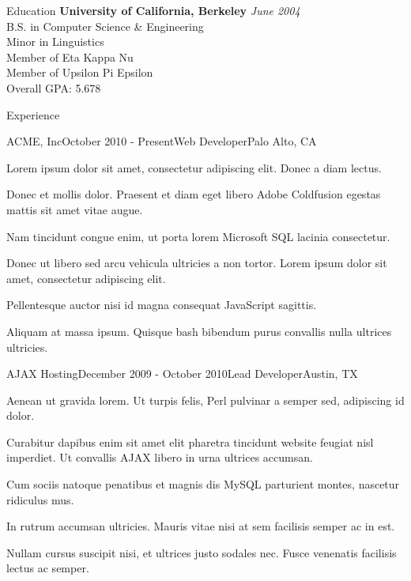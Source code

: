 \documentclass{resume}
\begin{document}
  \begin{rSection}{Education}
    {\bf University of California, Berkeley} \hfill {\em June 2004} \\ 
    { B.S. in Computer Science \& Engineering } \\
    { Minor in Linguistics } \smallskip \\
    { Member of Eta Kappa Nu } \\
    { Member of Upsilon Pi Epsilon } \\
    Overall GPA: 5.678
  \end{rSection}
  
  \begin{rSection}{Experience}
  
    \begin{rSubsection}{ACME, Inc}{October 2010 - Present}{Web Developer}{Palo Alto, CA}
    \item Lorem ipsum dolor sit amet, consectetur adipiscing elit. Donec a diam lectus.
    \item Donec et mollis dolor. Praesent et diam eget libero Adobe Coldfusion egestas mattis sit amet vitae augue.
    \item Nam tincidunt congue enim, ut porta lorem Microsoft SQL lacinia consectetur.
    \item Donec ut libero sed arcu vehicula ultricies a non tortor. Lorem ipsum dolor sit amet, consectetur adipiscing elit.
    \item Pellentesque auctor nisi id magna consequat JavaScript sagittis.
    \item Aliquam at massa ipsum. Quisque bash bibendum purus convallis nulla ultrices ultricies.
    \end{rSubsection}
  
    \begin{rSubsection}{AJAX Hosting}{December 2009 - October 2010}{Lead Developer}{Austin, TX}
    \item Aenean ut gravida lorem. Ut turpis felis, Perl pulvinar a semper sed, adipiscing id dolor.
    \item Curabitur dapibus enim sit amet elit pharetra tincidunt website feugiat nisl imperdiet. Ut convallis AJAX libero in urna ultrices accumsan.
    \item Cum sociis natoque penatibus et magnis dis MySQL parturient montes, nascetur ridiculus mus.
    \item In rutrum accumsan ultricies. Mauris vitae nisi at sem facilisis semper ac in est.
    \item Nullam cursus suscipit nisi, et ultrices justo sodales nec. Fusce venenatis facilisis lectus ac semper.
    \end{rSubsection}


\end{rSection}
\end{document}
